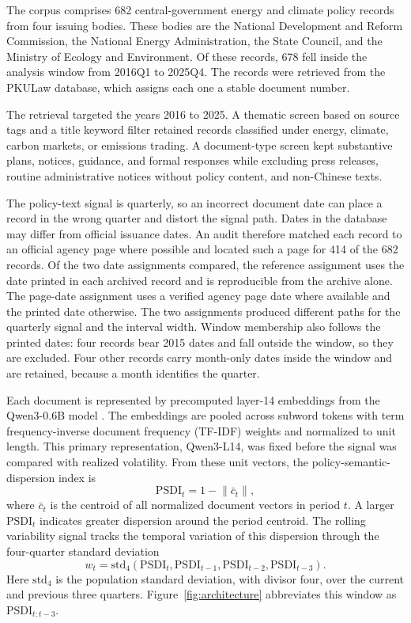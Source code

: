 \documentclass[5p,times,authoryear]{elsarticle}
\theoremstyle{plain}
\newcommand{\PSDI}{\mathrm{PSDI}}
\begin{document}
The corpus comprises 682 central-government energy and climate policy records from four issuing bodies. These bodies are the National Development and Reform Commission, the National Energy Administration, the State Council, and the Ministry of Ecology and Environment. Of these records, 678 fell inside the analysis window from 2016Q1 to 2025Q4. The records were retrieved from the PKULaw database, which assigns each one a stable document number.

The retrieval targeted the years 2016 to 2025. A thematic screen based on source tags and a title keyword filter retained records classified under energy, climate, carbon markets, or emissions trading. A document-type screen kept substantive plans, notices, guidance, and formal responses while excluding press releases, routine administrative notices without policy content, and non-Chinese texts.

The policy-text signal is quarterly, so an incorrect document date can place a record in the wrong quarter and distort the signal path. Dates in the database may differ from official issuance dates. An audit therefore matched each record to an official agency page where possible and located such a page for 414 of the 682 records. Of the two date assignments compared, the reference assignment uses the date printed in each archived record and is reproducible from the archive alone. The page-date assignment uses a verified agency page date where available and the printed date otherwise. The two assignments produced different paths for the quarterly signal and the interval width. Window membership also follows the printed dates: four records bear 2015 dates and fall outside the window, so they are excluded. Four other records carry month-only dates inside the window and are retained, because a month identifies the quarter.

Each document is represented by precomputed layer-14 embeddings from the Qwen3-0.6B model \citep{Yang2025}. The embeddings are pooled across subword tokens with term frequency-inverse document frequency (TF-IDF) weights and normalized to unit length. This primary representation, Qwen3-L14, was fixed before the signal was compared with realized volatility. From these unit vectors, the policy-semantic-dispersion index is
\begin{equation}
\PSDI_t=1-\lVert\bar{c}_t\rVert,
\label{eq:psdi}
\end{equation}
where $\bar{c}_t$ is the centroid of all normalized document vectors in period $t$. A larger $\PSDI_t$ indicates greater dispersion around the period centroid. The rolling variability signal tracks the temporal variation of this dispersion through the four-quarter standard deviation
\begin{equation}
w_t=\mathrm{std}_4(\PSDI_t,\PSDI_{t-1},\PSDI_{t-2},\PSDI_{t-3}).
\label{eq:wt}
\end{equation}
Here $\mathrm{std}_4$ is the population standard deviation, with divisor four, over the current and previous three quarters. Figure~\ref{fig:architecture} abbreviates this window as $\PSDI_{t:t-3}$.
\end{document}
